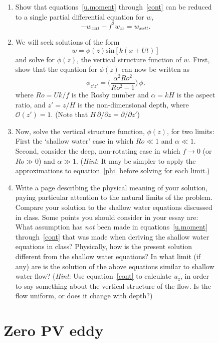 \documentclass[11pt]{report}
\numberwithin{equation}{section}
\begin{document}
\begin{figure}
\begin{enumerate}
\item  Show that equations~\ref{u.moment} through~\ref{cont} can be reduced
  to a single partial differential equation for $w$,
  \begin{equation}
    -w_{zztt} - f^2 w_{zz} = w_{xxtt}. \label{w.eqn}
  \end{equation}
\item  We will seek solutions of the form
  \begin{equation}
    w = \phi(z) \mathrm{sin}[k (x + U t)]
  \end{equation}
  and solve for $\phi(z)$, the vertical structure function of $w$.  First,
  show that the equation for $\phi(z)$ can now be written as
  \begin{equation}
    \phi_{z'z'} = \biggl(\frac{\alpha^2 Ro^2}{Ro^2-1} \biggr) \, \phi .
    \label{phi}
  \end{equation}
  where $Ro = U k / f$ is the Rosby number and $\alpha = k H$ is the aspect
  ratio, and $z' = z/H$ is the non-dimensional depth, where
  $\mathcal{O}(z') = 1$.  (Note that $H \,\partial / \partial z = 
  \partial / \partial z'$)
\item  Now, solve the vertical structure function, $\phi(z)$, for two
  limits: First the `shallow water' case in which $Ro \ll 1$ and $\alpha
  \ll 1$.  Second, consider the deep, non-rotating case in which
  $f\rightarrow0$ (or $Ro \gg 0$) and $\alpha \gg 1$. ({\em Hint}: It may
  be simpler to apply the approximations to equation~\ref{phi} before
  solving for each limit.)
\item  Write a page describing the physical meaning of your solution, paying particular attention to the natural limits of the problem.  Compare your solution to the shallow water equations discussed in class.  Some points you should consider in your essay are:  What assumption has {\em not} been made in equations~\ref{u.moment} through~\ref{cont} that was made when deriving the shallow water equations in class?  Physically, how is the present solution different from the shallow water equations?  In what limit (if any) are is the solution of the above equations similar to shallow water flow?  ({\em Hint}: Use equation~\ref{cont} to calculate $u_z$, in order to say something about the vertical structure of the flow.  Is the flow uniform, or does it change with depth?)
\end{enumerate}

\section{Zero PV eddy}
\label{prob:zero_pv_eddy}


\end{figure}
\end{document}
